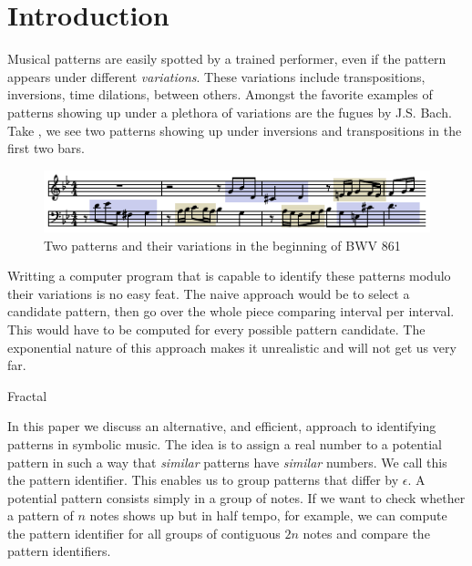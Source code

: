 \newcommand{\victor}[1]{{\color{blue}\textbf{[victor:}\textit{#1}\textbf{]}}}
\newcommand{\dimbc}{\mathrm{dim}^{\mathrm{BC}}}

\section{Introduction}
\label{sec:intro}

  Musical patterns are easily spotted by a trained performer,
even if the pattern appears under different \emph{variations}.  These
variations include transpositions, inversions, time dilations, between
others. Amongst the favorite examples of patterns showing up under a
plethora of variations are the fugues by J.S. Bach. Take
, we see two patterns showing up under
inversions and transpositions in the first two bars.

\begin{figure}
  \includegraphics[width=\linewidth]{src/img/bwv861-start-section-patterns.pdf}
  \caption{Two patterns and their variations in the beginning of BWV 861}
  \label{fig:egbach}
\end{figure}

  Writting a computer program that is capable to identify these
patterns modulo their variations is no easy feat. The naive approach
would be to select a candidate pattern, then go over the whole
piece comparing interval per interval. This would have to be computed
for every possible pattern candidate. The exponential nature of this
approach makes it unrealistic and will not get us very far.

  Fractal~\cite{bouligand1928ensembles}

  In this paper we discuss an alternative, and efficient, approach to
identifying patterns in symbolic music. The idea is to assign a real
number to a potential pattern in such a way that \emph{similar}
patterns have \emph{similar} numbers. We call this the pattern
identifier.  This enables us to group patterns that differ by
$\epsilon$.  A potential pattern consists simply in a group of
notes. If we want to check whether a pattern of $n$ notes shows up but
in half tempo, for example, we can compute the pattern identifier for
all groups of contiguous $2n$ notes and compare the pattern
identifiers.  

